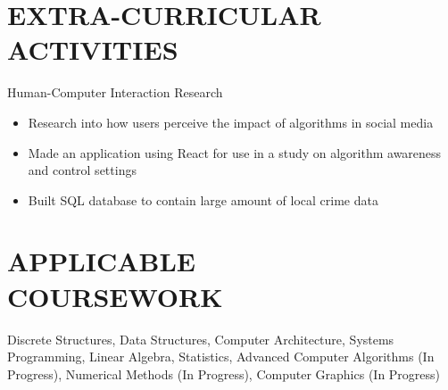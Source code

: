 \documentclass[margin]{res}
\begin{document}
\begin{resume}
\section{EXTRA-CURRICULAR \\ ACTIVITIES}             
                Human-Computer Interaction Research
                \begin{itemize} \itemsep -2pt %
                    \item Research into how users perceive the impact of algorithms in social media
                    \item Made an application using React for use in a study on algorithm awareness and control settings
                    \item Built SQL database to contain large amount of local crime data
                \end{itemize}


\section{APPLICABLE \\ COURSEWORK}             
Discrete Structures, Data Structures, Computer Architecture, Systems Programming, Linear Algebra, Statistics, Advanced Computer Algorithms (In Progress), Numerical Methods (In Progress), Computer Graphics (In Progress)

\end{resume}
\end{document}
